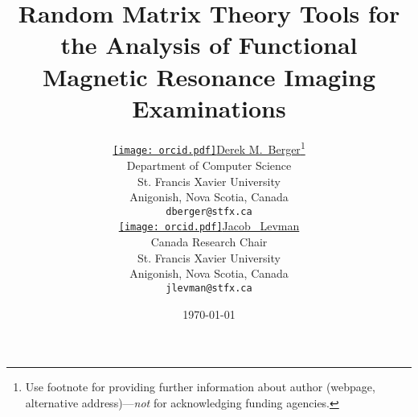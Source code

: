 \title{Random Matrix Theory Tools for the Analysis of Functional Magnetic Resonance Imaging Examinations}
\date{\today}
\author{ \href{https://orcid.org/0000-0003-4733-0624}{\texttt{[image: orcid.pdf]}\hspace{1mm}Derek M.~Berger}\thanks{Use footnote for providing further
    information about author (webpage, alternative
    address)---\emph{not} for acknowledging funding agencies.} \\
  Department of Computer Science\\
  St. Francis Xavier University\\
  Anigonish, Nova Scotia, Canada \\
  \texttt{dberger@stfx.ca} \\
  \AND
  \href{https://orcid.org/0000-0002-9604-3157}{\texttt{[image: orcid.pdf]}\hspace{1mm}Jacob ~Levman} \\
  Canada Research Chair\\
  St. Francis Xavier University\\
  Anigonish, Nova Scotia, Canada \\
  \texttt{jlevman@stfx.ca} \\
}